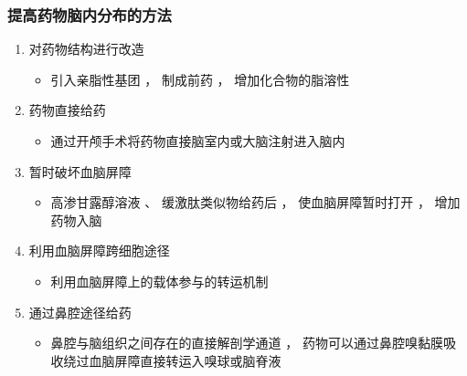 \documentclass[dvipsnames, svgnames, x11names]{beamer}
\begin{document}
\begin{frame}
    \frametitle{提高药物脑内分布的方法}
    \begin{enumerate}
      \item 对药物结构进行改造
      \begin{itemize}
        \item 引入亲脂性基团 ， 制成前药 ， 增加化合物的脂溶性
      \end{itemize}
      \item 药物直接给药
      \begin{itemize}
        \item 通过开颅手术将药物直接脑室内或大脑注射进入脑内
      \end{itemize}
      \item 暂时破坏血脑屏障
      \begin{itemize}
        \item 高渗甘露醇溶液 、 缓激肽类似物给药后 ， 使血脑屏障暂时打开 ， 增加药物入脑
      \end{itemize}
      \item 利用血脑屏障跨细胞途径
      \begin{itemize}
        \item 利用血脑屏障上的载体参与的转运机制
      \end{itemize}
      \item 通过鼻腔途径给药
      \begin{itemize}
        \item 鼻腔与脑组织之间存在的直接解剖学通道 ， 药物可以通过鼻腔嗅黏膜吸收绕过血脑屏障直接转运入嗅球或脑脊液
      \end{itemize}
    \end{enumerate}
\end{frame}
\end{document}
